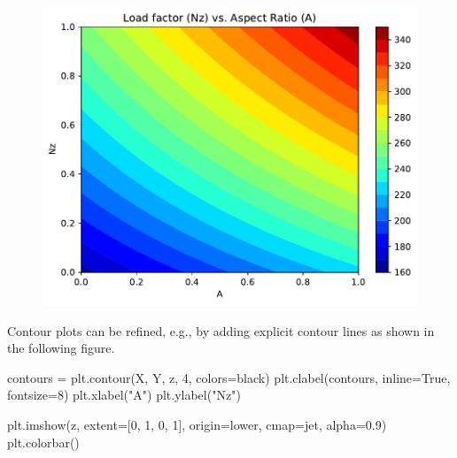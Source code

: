 \documentclass[
  letterpaper,
  DIV=11,
  numbers=noendperiod]{scrreprt}
\newenvironment{Shaded}{\begin{snugshade}}{\end{snugshade}}
\newcommand{\DecValTok}[1]{\textcolor[rgb]{0.68,0.00,0.00}{#1}}
\newcommand{\FloatTok}[1]{\textcolor[rgb]{0.68,0.00,0.00}{#1}}
\newcommand{\NormalTok}[1]{\textcolor[rgb]{0.00,0.23,0.31}{#1}}
\newcommand{\OperatorTok}[1]{\textcolor[rgb]{0.37,0.37,0.37}{#1}}
\newcommand{\StringTok}[1]{\textcolor[rgb]{0.13,0.47,0.30}{#1}}
\newcommand{\VariableTok}[1]{\textcolor[rgb]{0.07,0.07,0.07}{#1}}
\begin{document}
\begin{figure}[H]

{\centering \includegraphics{002_awwe_files/figure-pdf/cell-5-output-1.pdf}

}

\end{figure}

Contour plots can be refined, e.g., by adding explicit contour lines as
shown in the following figure.

\begin{Shaded}
\begin{Highlighting}[]
\NormalTok{contours }\OperatorTok{=}\NormalTok{ plt.contour(X, Y, z, }\DecValTok{4}\NormalTok{, colors}\OperatorTok{=}\StringTok{\textquotesingle{}black\textquotesingle{}}\NormalTok{)}
\NormalTok{plt.clabel(contours, inline}\OperatorTok{=}\VariableTok{True}\NormalTok{, fontsize}\OperatorTok{=}\DecValTok{8}\NormalTok{)}
\NormalTok{plt.xlabel(}\StringTok{"A"}\NormalTok{)}
\NormalTok{plt.ylabel(}\StringTok{"Nz"}\NormalTok{)}

\NormalTok{plt.imshow(z, extent}\OperatorTok{=}\NormalTok{[}\DecValTok{0}\NormalTok{, }\DecValTok{1}\NormalTok{, }\DecValTok{0}\NormalTok{, }\DecValTok{1}\NormalTok{], origin}\OperatorTok{=}\StringTok{\textquotesingle{}lower\textquotesingle{}}\NormalTok{,}
\NormalTok{           cmap}\OperatorTok{=}\StringTok{\textquotesingle{}jet\textquotesingle{}}\NormalTok{, alpha}\OperatorTok{=}\FloatTok{0.9}\NormalTok{)}
\NormalTok{plt.colorbar()}
\end{Highlighting}
\end{Shaded}
\end{document}
